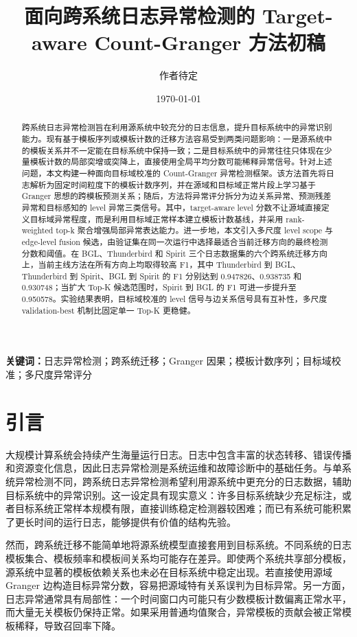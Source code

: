 \documentclass[UTF8,a4paper,zihao=-4]{ctexart}
\title{面向跨系统日志异常检测的 Target-aware Count-Granger 方法初稿}
\author{作者待定}
\date{\today}
\begin{document}
\maketitle

\begin{abstract}
跨系统日志异常检测旨在利用源系统中较充分的日志信息，提升目标系统中的异常识别能力。现有基于模板序列或模板计数的迁移方法容易受到两类问题影响：一是源系统中的模板关系并不一定能在目标系统中保持一致；二是目标系统中的异常往往只体现在少量模板计数的局部突增或突降上，直接使用全局平均分数可能稀释异常信号。针对上述问题，本文构建一种面向目标域校准的 Count-Granger 异常检测框架。该方法首先将日志解析为固定时间粒度下的模板计数序列，并在源域和目标域正常片段上学习基于 Granger 思想的跨模板预测关系；随后，方法将异常评分拆分为边关系异常、预测残差异常和目标感知的 level 异常三类信号。其中，target-aware level 分数不让源域直接定义目标域异常程度，而是利用目标域正常样本建立模板计数基线，并采用 rank-weighted top-k 聚合增强局部异常表达能力。进一步地，本文引入多尺度 level scope 与 edge-level fusion 候选，由验证集在同一次运行中选择最适合当前迁移方向的最终检测分数和阈值。在 BGL、Thunderbird 和 Spirit 三个日志数据集的六个跨系统迁移方向上，当前主线方法在所有方向上均取得较高 F1，其中 Thunderbird 到 BGL、Thunderbird 到 Spirit、BGL 到 Spirit 的 F1 分别达到 0.947826、0.938735 和 0.930748；当扩大 Top-K 候选范围时，Spirit 到 BGL 的 F1 可进一步提升至 0.950578。实验结果表明，目标域校准的 level 信号与边关系信号具有互补性，多尺度 validation-best 机制比固定单一 Top-K 更稳健。
\end{abstract}

\noindent\textbf{关键词：}日志异常检测；跨系统迁移；Granger 因果；模板计数序列；目标域校准；多尺度异常评分

\section{引言}

大规模计算系统会持续产生海量运行日志。日志中包含丰富的状态转移、错误传播和资源变化信息，因此日志异常检测是系统运维和故障诊断中的基础任务。与单系统异常检测不同，跨系统日志异常检测希望利用源系统中更充分的日志数据，辅助目标系统中的异常识别。这一设定具有现实意义：许多目标系统缺少充足标注，或者目标系统正常样本规模有限，直接训练稳定检测器较困难；而已有系统可能积累了更长时间的运行日志，能够提供有价值的结构先验。

然而，跨系统迁移不能简单地将源系统模型直接套用到目标系统。不同系统的日志模板集合、模板频率和模板间关系均可能存在差异。即使两个系统共享部分模板，源系统中显著的模板依赖关系也未必在目标系统中稳定出现。若直接使用源域 Granger 边构造目标异常分数，容易把源域特有关系误判为目标异常。另一方面，日志异常通常具有局部性：一个时间窗口内可能只有少数模板计数偏离正常水平，而大量无关模板仍保持正常。如果采用普通均值聚合，异常模板的贡献会被正常模板稀释，导致召回率下降。
\end{document}
